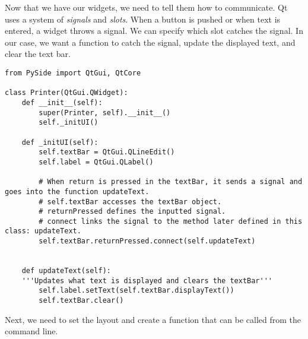 Now that we have our widgets, we need to tell them how to communicate.
Qt uses a system of \emph{signals} and \emph{slots}.
When a button is pushed or when text is entered, a widget throws a signal.
We can specify which slot catches the signal.
In our case, we want a function to catch the signal, update the displayed text, and clear the text bar.

\begin{lstlisting}
from PySide import QtGui, QtCore

class Printer(QtGui.QWidget):
	def __init__(self):
		super(Printer, self).__init__()
		self._initUI()

	def _initUI(self):
		self.textBar = QtGui.QLineEdit()
		self.label = QtGui.QLabel()
		
		# When return is pressed in the textBar, it sends a signal and goes into the function updateText.
        # self.textBar accesses the textBar object.
        # returnPressed defines the inputted signal.
        # connect links the signal to the method later defined in this class: updateText.
		self.textBar.returnPressed.connect(self.updateText)
	
		
	def updateText(self):
	'''Updates what text is displayed and clears the textBar'''
		self.label.setText(self.textBar.displayText())
		self.textBar.clear()

\end{lstlisting}

Next, we need to set the layout and create a function that can be called from the command line.

